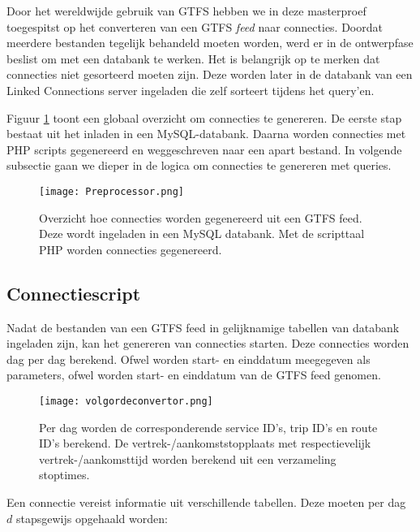 Door het wereldwijde gebruik van GTFS hebben we in deze masterproef toegespitst op het converteren van een GTFS \textit{feed} naar connecties. Doordat meerdere bestanden tegelijk behandeld moeten worden, werd er in de ontwerpfase beslist om met een databank te werken. Het is belangrijk op te merken dat connecties niet gesorteerd moeten zijn. Deze worden later in de databank van een Linked Connections server ingeladen die zelf sorteert tijdens het query'en. 

Figuur \ref{inladengtfs} toont een globaal overzicht om connecties te genereren. De eerste stap bestaat uit het inladen in een MySQL-databank. Daarna worden connecties met PHP scripts gegenereerd en weggeschreven naar een apart bestand. In volgende subsectie gaan we dieper in de logica om connecties te genereren met queries.

\begin{figure}[h!]
\centering
\texttt{[image: Preprocessor.png]}
\caption{Overzicht hoe connecties worden gegenereerd uit een GTFS feed. Deze wordt ingeladen in een MySQL databank. Met de scripttaal PHP worden connecties gegenereerd.}
\label{inladengtfs}
\end{figure}

\subsection{Connectiescript}

Nadat de bestanden van een GTFS feed in gelijknamige tabellen van databank ingeladen zijn, kan het genereren van connecties starten. Deze connecties worden dag per dag berekend. Ofwel worden start- en einddatum meegegeven als parameters, ofwel worden start- en einddatum van de GTFS feed  genomen. 

\begin{figure}[h!]
\centering
\texttt{[image: volgordeconvertor.png]}
\caption{Per dag worden de corresponderende service ID's, trip ID's en route ID's berekend. De vertrek-/aankomststopplaats met respectievelijk vertrek-/aankomsttijd worden berekend uit een verzameling stoptimes. }
\end{figure}

Een connectie vereist informatie uit verschillende tabellen. Deze moeten per dag $d$ stapsgewijs opgehaald worden:

